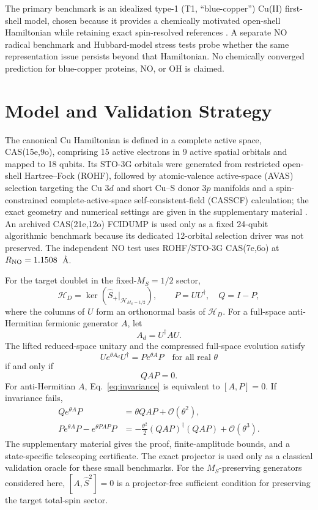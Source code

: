 \documentclass[
 aip,
 jcp,
 amsmath,amssymb,
 preprint
]{revtex4-2}
\begin{document}
The primary benchmark is an idealized type-1 (T1, ``blue-copper'') Cu(II) first-shell model, chosen because it provides a chemically motivated open-shell Hamiltonian while retaining exact spin-resolved references \cite{solomon2004bluecopper,solomon2014copper}.
A separate NO radical benchmark and Hubbard-model stress tests probe whether the same representation issue persists beyond that Hamiltonian.
No chemically converged prediction for blue-copper proteins, NO, or OH is claimed.

\section{Model and Validation Strategy}

The canonical Cu Hamiltonian is defined in a complete active space, CAS(15e,9o), comprising 15 active electrons in 9 active spatial orbitals and mapped to 18 qubits.
Its STO-3G orbitals were generated from restricted open-shell Hartree--Fock (ROHF), followed by atomic-valence active-space (AVAS) selection targeting the Cu $3d$ and short Cu--S donor $3p$ manifolds and a spin-constrained complete-active-space self-consistent-field (CASSCF) calculation; the exact geometry and numerical settings are given in the supplementary material \cite{sun2018pyscf,sayfutyarova2017avas}.
An archived CAS(21e,12o) FCIDUMP is used only as a fixed 24-qubit algorithmic benchmark because its dedicated 12-orbital selection driver was not preserved.
The independent NO test uses ROHF/STO-3G CAS(7e,6o) at $R_{\rm NO}=1.1508$~\AA{}.

For the target doublet in the fixed-$M_S=1/2$ sector,
\begin{equation}
\mathcal H_D=\ker\!\left(\hat S_+\big|_{\mathcal H_{M_S=1/2}}\right),
\qquad
P=UU^\dagger,\quad Q=I-P,
\end{equation}
where the columns of $U$ form an orthonormal basis of $\mathcal H_D$.
For a full-space anti-Hermitian fermionic generator $A$, let
\begin{equation}
A_d=U^\dagger A U.
\end{equation}
The lifted reduced-space unitary and the compressed full-space evolution satisfy
\begin{equation}
Ue^{\theta A_d}U^\dagger
=
Pe^{\theta A}P
\quad\text{for all real }\theta
\end{equation}
if and only if
\begin{equation}
QAP=0.
\label{eq:invariance}
\end{equation}
For anti-Hermitian $A$, Eq.~\ref{eq:invariance} is equivalent to $[A,P]=0$.
If invariance fails,
\begin{align}
Qe^{\theta A}P&=\theta QAP+\mathcal O(\theta^2),\\
Pe^{\theta A}P-e^{\theta PAP}P
&=
-\frac{\theta^2}{2}(QAP)^\dagger(QAP)+\mathcal O(\theta^3).
\end{align}
The supplementary material gives the proof, finite-amplitude bounds, and a state-specific telescoping certificate.
The exact projector is used only as a classical validation oracle for these small benchmarks. For the $M_S$-preserving generators considered here, $[A,\hat S^2]=0$ is a projector-free sufficient condition for preserving the target total-spin sector.
\end{document}
